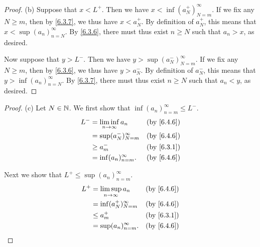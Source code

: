 \begin{proof}{(b)}
  Suppose that \(x < L^+\).
  Then we have \(x < \inf(a_N^+)_{N = m}^\infty\).
  If we fix any \(N \geq m\), then by \cref{6.3.7}, we thus have \(x < a_N^+\).
  By definition of \(a_N^+\), this means that \(x < \sup(a_n)_{n = N}^\infty\).
  By \cref{6.3.6}, there must thus exist \(n \geq N\) such that \(a_n > x\), as desired.

  Now suppose that \(y > L^-\).
  Then we have \(y > \sup(a_N^-)_{N = m}^\infty\).
  If we fix any \(N \geq m\), then by \cref{6.3.6}, we thus have \(y > a_N^-\).
  By definition of \(a_N^-\), this means that \(y > \inf(a_n)_{n = N}^\infty\).
  By \cref{6.3.7}, there must thus exist \(n \geq N\) such that \(a_n < y\), as desired.
\end{proof}

\begin{proof}{(c)}
  Let \(N \in \mathbb{N}\).
  We first show that \(\inf(a_n)_{n = m}^\infty \leq L^-\).
  \begin{align*}
    L^- & = \liminf_{n \to \infty} a_n &  & \text{(by \cref{6.4.6})} \\
        & = \sup(a_N^-)_{N = m}^\infty &  & \text{(by \cref{6.4.6})} \\
        & \geq a_m^-                   &  & \text{(by \cref{6.3.1})} \\
        & = \inf(a_n)_{n = m}^\infty.  &  & \text{(by \cref{6.4.6})}
  \end{align*}

  Next we show that \(L^+ \leq \sup(a_n)_{n = m}^\infty\).
  \begin{align*}
    L^+ & = \limsup_{n \to \infty} a_n &  & \text{(by \cref{6.4.6})} \\
        & = \inf(a_N^+)_{N = m}^\infty &  & \text{(by \cref{6.4.6})} \\
        & \leq a_m^+                   &  & \text{(by \cref{6.3.1})} \\
        & = \sup(a_n)_{n = m}^\infty.  &  & \text{(by \cref{6.4.6})}
  \end{align*}


\end{proof}
